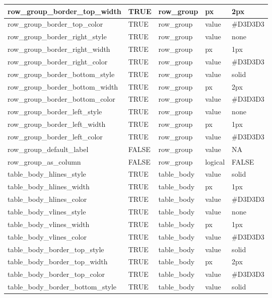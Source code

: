 \documentclass[
  letterpaper,
  DIV=11,
  numbers=noendperiod]{scrartcl}
\begin{document}
\begin{table}
{\begin{tabular}[t]{l|l|l|l|l}
\hline
row\_group\_border\_top\_width & TRUE & row\_group & px & 2px\\
\hline
row\_group\_border\_top\_color & TRUE & row\_group & value & \#D3D3D3\\
\hline
row\_group\_border\_right\_style & TRUE & row\_group & value & none\\
\hline
row\_group\_border\_right\_width & TRUE & row\_group & px & 1px\\
\hline
row\_group\_border\_right\_color & TRUE & row\_group & value & \#D3D3D3\\
\hline
row\_group\_border\_bottom\_style & TRUE & row\_group & value & solid\\
\hline
row\_group\_border\_bottom\_width & TRUE & row\_group & px & 2px\\
\hline
row\_group\_border\_bottom\_color & TRUE & row\_group & value & \#D3D3D3\\
\hline
row\_group\_border\_left\_style & TRUE & row\_group & value & none\\
\hline
row\_group\_border\_left\_width & TRUE & row\_group & px & 1px\\
\hline
row\_group\_border\_left\_color & TRUE & row\_group & value & \#D3D3D3\\
\hline
row\_group\_default\_label & FALSE & row\_group & value & NA\\
\hline
row\_group\_as\_column & FALSE & row\_group & logical & FALSE\\
\hline
table\_body\_hlines\_style & TRUE & table\_body & value & solid\\
\hline
table\_body\_hlines\_width & TRUE & table\_body & px & 1px\\
\hline
table\_body\_hlines\_color & TRUE & table\_body & value & \#D3D3D3\\
\hline
table\_body\_vlines\_style & TRUE & table\_body & value & none\\
\hline
table\_body\_vlines\_width & TRUE & table\_body & px & 1px\\
\hline
table\_body\_vlines\_color & TRUE & table\_body & value & \#D3D3D3\\
\hline
table\_body\_border\_top\_style & TRUE & table\_body & value & solid\\
\hline
table\_body\_border\_top\_width & TRUE & table\_body & px & 2px\\
\hline
table\_body\_border\_top\_color & TRUE & table\_body & value & \#D3D3D3\\
\hline
table\_body\_border\_bottom\_style & TRUE & table\_body & value & solid\\

\end{tabular}}
\end{table}
\end{document}
